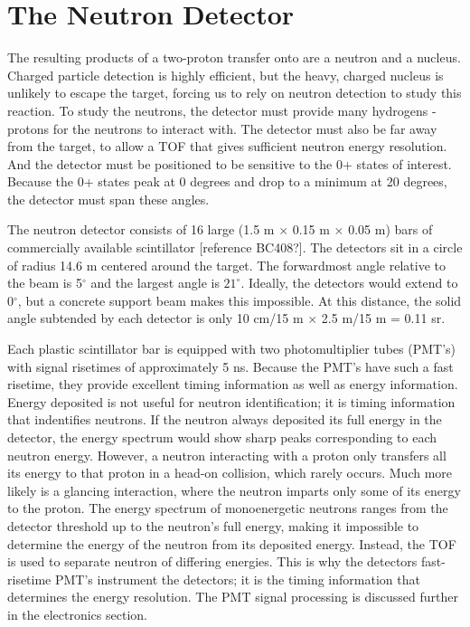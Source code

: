 \section{The Neutron Detector}

The resulting products of a two-proton transfer onto  are a neutron and a  nucleus.  Charged particle detection is highly efficient, but the heavy, charged  nucleus is unlikely to escape the target, forcing us to rely on neutron detection to study this reaction. To study the neutrons, the detector must provide many hydrogens - protons for the neutrons to interact with.  The detector must also be far away from the target, to allow a TOF that gives sufficient neutron energy resolution.  And the detector must be positioned to be sensitive to the 0+ states of interest.  Because the 0+ states peak at 0 degrees and drop to a minimum at 20 degrees, the detector must span these angles.

The neutron detector consists of 16 large (1.5 m $\times$ 0.15 m $\times$ 0.05 m) bars of commercially available scintillator [reference BC408?].  The detectors sit in a circle of radius 14.6 m centered around the target.  The forwardmost angle relative to the beam is 5$^{\circ}$ and the largest angle is $21^{\circ}$.  Ideally, the detectors would extend to 0$^{\circ}$, but a concrete support beam makes this impossible.  At this distance, the solid angle subtended by each detector is only 10 cm/15 m $\times$ 2.5 m/15 m = 0.11 sr.


Each plastic scintillator bar is equipped with two photomultiplier tubes (PMT's) with signal risetimes of approximately 5 ns.  Because the PMT's have such a fast risetime, they provide excellent timing information as well as energy information.  Energy deposited is not useful for neutron identification; it is timing information that indentifies neutrons.  If the neutron always deposited its full energy in the detector, the energy spectrum would show sharp peaks corresponding to each neutron energy.  However, a neutron interacting with a proton only transfers all its energy to that proton in a head-on collision, which rarely occurs.  Much more likely is a glancing interaction, where the neutron imparts only some of its energy to the proton.  The energy spectrum of monoenergetic neutrons ranges from the detector threshold up to the neutron's full energy, making it impossible to determine the energy of the neutron from its deposited energy.  Instead, the TOF is used to separate neutron of differing energies.  This is why the detectors fast-risetime PMT's instrument the detectors; it is the timing information that determines the energy resolution.  The PMT signal processing is discussed further in the electronics section.

